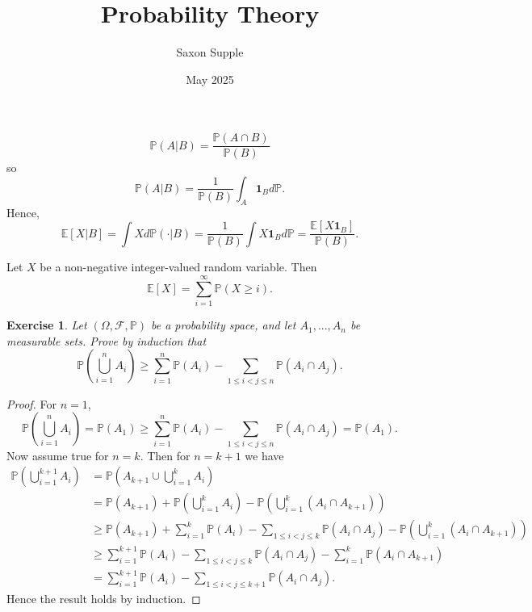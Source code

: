 \documentclass{article}
\title{Probability Theory}
\author{Saxon Supple}
\date{May 2025}
\newtheorem{exercise}[theorem]{Exercise}
\begin{document}
\maketitle

\[\mathbb{P}(A|B)=\frac{\mathbb{P}(A\cap B)}{\mathbb{P}(B)}\] so \[\mathbb{P}(A|B)=\frac{1}{\mathbb{P}(B)}\int_A\mathbf{1}_Bd\mathbb{P}.\] Hence,\[\mathbb{E}[X|B]=\int Xd\mathbb{P}(\cdot |B)=\frac{1}{\mathbb{P}(B)}\int X\mathbf{1}_Bd\mathbb{P}=\frac{\mathbb{E}[X\mathbf{1}_B]}{\mathbb{P}(B)}.\]


Let $X$ be a non-negative integer-valued random variable. Then \[\mathbb{E}[X]=\sum_{i=1}^\infty\mathbb{P}(X\geq i).\]


\begin{exercise}
Let $(\Omega,\mathcal{F},\mathbb{P})$ be a probability space, and let $A_1,...,A_n$ be measurable sets. Prove by induction that\[\mathbb{P}(\bigcup_{i=1}^nA_i)\geq\sum_{i=1}^n\mathbb{P}(A_i)-\sum_{1\leq i < j\leq n}\mathbb{P}(A_i\cap A_j).\]
\end{exercise}
\begin{proof}
For $n=1$, \[\mathbb{P}\left(\bigcup_{i=1}^n A_i\right)=\mathbb{P}(A_1)\geq\sum_{i=1}^n\mathbb{P}(A_i)-\sum_{1\leq i < j\leq n}\mathbb{P}(A_i\cap A_j)=\mathbb{P}(A_1).\] Now assume true for $n=k$. Then for $n=k+1$ we have\begin{align*}
\mathbb{P}\left(\bigcup_{i=1}^{k+1}A_i\right)&=\mathbb{P}\left(A_{k+1}\cup\bigcup_{i=1}^{k}A_i\right)\\&=\mathbb{P}(A_{k+1})+\mathbb{P}\left(\bigcup_{i=1}^{k}A_i\right)-\mathbb{P}\left(\bigcup_{i=1}^{k}(A_i\cap A_{k+1})\right)\\&\geq\mathbb{P}(A_{k+1})+\sum_{i=1}^k\mathbb{P}(A_i)-\sum_{1\leq i<j\leq k}\mathbb{P}(A_i\cap A_j)-\mathbb{P}\left(\bigcup_{i=1}^{k}(A_i\cap A_{k+1})\right)\\&\geq\sum_{i=1}^{k+1}\mathbb{P}(A_i)-\sum_{1\leq i<j\leq k}\mathbb{P}(A_i\cap A_j)-\sum_{i=1}^k\mathbb{P}(A_i\cap A_{k+1})\\&=\sum_{i=1}^{k+1}\mathbb{P}(A_i)-\sum_{1\leq i<j\leq k+1}\mathbb{P}(A_i\cap A_j).
\end{align*}
Hence the result holds by induction.
\end{proof}
\end{document}

